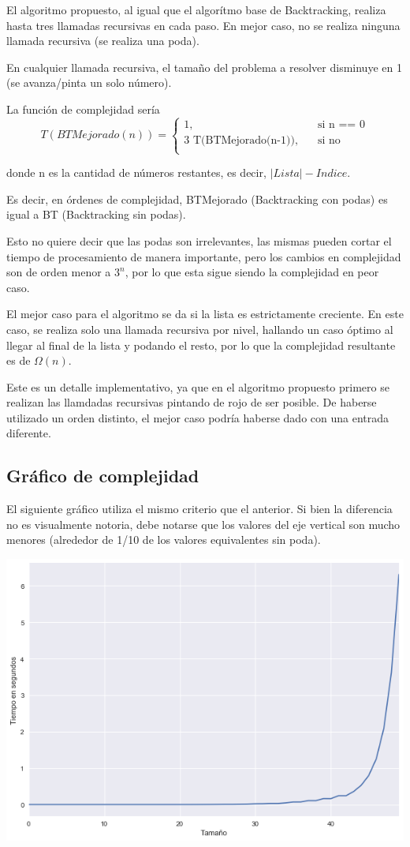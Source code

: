 	El algoritmo propuesto, al igual que el algorítmo base de Backtracking, realiza hasta tres llamadas recursivas en cada paso. En mejor caso, no se realiza ninguna llamada recursiva (se realiza una poda).

	En cualquier llamada recursiva, el tamaño del problema a resolver disminuye en 1 (se avanza/pinta un solo número).

	La función de complejidad sería
	\[
	T(BTMejorado(n)) =
		\begin{cases}
			\text{1,} &\quad\text{si n == 0}\\
			\text{3 T(BTMejorado(n-1)),} &\quad\text{si no} \\
		\end{cases}
	\]

	donde n es la cantidad de números restantes, es decir, $|Lista| - Indice$.

	Es decir, en órdenes de complejidad, BTMejorado (Backtracking con podas) es igual a BT (Backtracking sin podas).

	Esto no quiere decir que las podas son irrelevantes, las mismas pueden cortar el tiempo de procesamiento de manera importante, pero los cambios en complejidad son de orden menor a $3^n$, por lo que esta sigue siendo la complejidad en peor caso.

	El mejor caso para el algoritmo se da si la lista es estrictamente creciente. En este caso, se realiza solo una llamada recursiva por nivel, hallando un caso óptimo al llegar al final de la lista y podando el resto, por lo que la complejidad resultante es de $\Omega(n)$.

	Este es un detalle implementativo, ya que en el algoritmo propuesto primero se realizan las llamdadas recursivas pintando de rojo de ser posible. De haberse utilizado un orden distinto, el mejor caso podría haberse dado con una entrada diferente.

	\subsection{Gráfico de complejidad}

	El siguiente gráfico utiliza el mismo criterio que el anterior. Si bien la diferencia no es visualmente notoria, debe notarse que los valores del eje vertical son mucho menores (alrededor de 1/10 de los valores equivalentes sin poda).

	\begin{center}
	\includegraphics[width=.8\textwidth]{ej2.png}
	\end{center}


